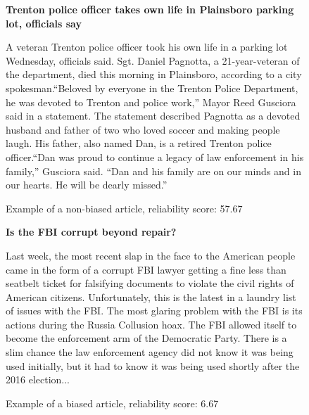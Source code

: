 \begin{figure}[htbp]
    \centering
    \begin{minipage}{0.9\linewidth}
        \begin{center}
            \small{\textbf{Trenton police officer takes own life in Plainsboro parking lot, officials say}}
        \end{center}
        \scriptsize{
            A veteran Trenton police officer took his own life in a parking lot Wednesday, officials said. Sgt. Daniel Pagnotta, a 21-year-veteran of the department, died this morning in Plainsboro, according to a city spokesman.“Beloved by everyone in the Trenton Police Department, he was devoted to Trenton and police work,” Mayor Reed Gusciora said in a statement. The statement described Pagnotta as a devoted husband and father of two who loved soccer and making people laugh. His father, also named Dan, is a retired Trenton police officer.“Dan was proud to continue a legacy of law enforcement in his family,” Gusciora said. “Dan and his family are on our minds and in our hearts. He will be dearly missed.”}
    \end{minipage}
    \caption{Example of a non-biased article, reliability score: 57.67}
    \label{fig:example-nonbiased-article-1}
\end{figure}

\begin{figure}[htbp]
    \centering
    \begin{minipage}{0.9\linewidth}
        \begin{center}
            \small{\textbf{Is the FBI corrupt beyond repair?}}
        \end{center}
        \scriptsize{
            Last week, the most recent slap in the face to the American people came in the form of a corrupt FBI lawyer getting a fine less than seatbelt ticket for falsifying documents to violate the civil rights of American citizens. Unfortunately, this is the latest in a laundry list of issues with the FBI. The most glaring problem with the FBI is its actions during the Russia Collusion hoax. The FBI allowed itself to become the enforcement arm of the Democratic Party. There is a slim chance the law enforcement agency did not know it was being used initially, but it had to know it was being used shortly after the 2016 election...
        }
    \end{minipage}
    \caption{Example of a biased article, reliability score: 6.67}
    \label{fig:example-biased-article-1}
\end{figure}


